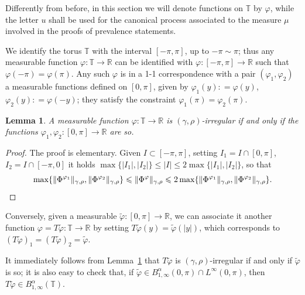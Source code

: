 \documentclass[11pt,oneside,reqno]{amsart}
\newtheorem{lemma}[theorem]{Lemma}
\numberwithin{equation}{section}
\begin{document}
Differently from before, in this section we will denote functions on
$\mathbb{T}$ by $\varphi$, while the letter $u$ shall be used for the
canonical process associated to the measure $\mu$ involved in the proofs of
prevalence statements.

We identify the torus $\mathbb{T}$ with the interval $[- \pi, \pi]$, up to $-
\pi \sim \pi$; thus any measurable function $\varphi : \mathbb{T} \rightarrow
\mathbb{R}$ can be identified with $\varphi : [- \pi, \pi] \rightarrow
\mathbb{R}$ such that $\varphi (- \pi) = \varphi (\pi)$. Any such $\varphi$ is
in a 1-1 correspondence with a pair $(\varphi_1, \varphi_2)$ a measurable
functions defined on $[0, \pi]$, given by $\varphi_1 (y) : = \varphi (y)$,
$\varphi_2 (y) : = \varphi (- y)$; they satisfy the constraint $\varphi_1
(\pi) = \varphi_2 (\pi)$.

\begin{lemma}
  \label{lem:techlem-rho}A measurable function $\varphi : \mathbb{T}
  \rightarrow \mathbb{R}$ is $(\gamma, \rho)$-irregular if and only if the
  functions $\varphi_1, \varphi_2 : [0, \pi] \rightarrow \mathbb{R}$ are so.
\end{lemma}

\begin{proof}
  The proof is elementary. Given $I \subset [- \pi, \pi]$, setting $I_1 = I
  \cap [0, \pi]$, $I_2 = I \cap [- \pi, 0]$ it holds $\max \{ | I_1 |, | I_2 |
  \} \leqslant | I | \leqslant 2 \max \{ | I_1 |, | I_2 | \}$, so that
  \[ \max \{ \| \Phi^{\varphi_1} \|_{\gamma, \rho}, \| \Phi^{\varphi_2}
     \|_{\gamma, \rho} \} \leqslant \| \Phi^{\varphi} \|_{\gamma, \rho}
     \leqslant 2 \max \{ \| \Phi^{\varphi_1} \|_{\gamma, \rho}, \|
     \Phi^{\varphi_2} \|_{\gamma, \rho} \} . \qedhere \]
\end{proof}

Conversely, given a measurable $\tilde{\varphi} : [0, \pi] \rightarrow
\mathbb{R}$, we can associate it another function $\varphi = T \tilde{\varphi}
: \mathbb{T} \rightarrow \mathbb{R}$ by setting $T \tilde{\varphi} (y) =
\tilde{\varphi} (| y |)$, which corresponds to $(T \tilde{\varphi})_1 = (T
\tilde{\varphi})_2 = \tilde{\varphi} $.

It immediately follows from Lemma~\ref{lem:techlem-rho} that $T
\tilde{\varphi}$ is $(\gamma, \rho)$-irregular if and only if
$\tilde{\varphi}$ is so; it is also easy to check that, if $\tilde{\varphi}
\in B^{\alpha}_{1, \infty} (0, \pi) \cap L^{\infty} (0, \pi)$, then $T
\tilde{\varphi} \in B^{\alpha}_{1, \infty} (\mathbb{T})$.
\end{document}
